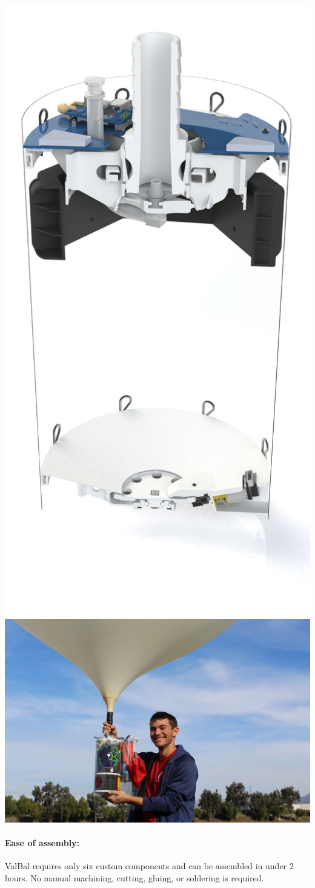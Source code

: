 \documentclass[12pt, twocolumn]{article}
\begin{document}
{%
\vspace*{\fill}
\begin{center}\includegraphics[width=0.5\linewidth,trim={0cm 13cm 0cm 5cm},clip]{render.jpg}\includegraphics[width=0.5\linewidth,trim={12cm 2cm 25cm 12cm},clip]{vbpic.jpg}\end{center}
\paragraph{\sffamily Ease of assembly: } ValBal requires only six custom components and can be assembled in under 2 hours. No manual machining, cutting, gluing, or soldering is required.\footnotemark
{}

}
\end{document}
